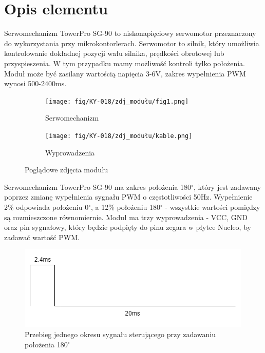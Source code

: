 \documentclass[11pt, a4paper]{article}
\author{Antoni Borowski}
\institute{Instytut Robotyki i Inteligencji Maszynowej}
\begin{document}
\newpage

\section*{Opis elementu} 
Serwomechanizm TowerPro SG-90 to niskonapięciowy serwomotor przeznaczony do wykorzystania przy mikrokontorlerach. Serwomotor to silnik, który umożliwia kontrolowanie dokładnej pozycji wału silnika, prędkości obrotowej lub przyspieszenia. W tym przypadku mamy możliwość kontroli tylko położenia. Moduł może być zasilany wartością napięcia 3-6V, zakres wypełnienia PWM wynosi 500-2400ms.

\begin{figure}[h!]
\centering
\begin{subfigure}{.5\textwidth}
  \centering
  \texttt{[image: fig/KY-018/zdj\_modułu/fig1.png]}
  \caption{Serwomechanizm}
  \label{fig:sub1}
\end{subfigure}%
\begin{subfigure}{.5\textwidth}
  \centering
  \texttt{[image: fig/KY-018/zdj\_modułu/kable.png]}
  \caption{Wyprowadzenia}
  \label{fig:sub2}
\end{subfigure}
\caption{Poglądowe zdjęcia modułu}
\label{fig:test}
\end{figure}

\newline
Serwomechanizm TowerPro SG-90 ma zakres położenia 180$^{\circ}$, który jest zadawany poprzez zmianę wypełnienia sygnału PWM o częstotliwości 50Hz. Wypełnienie 2\% odpowiada położeniu 0$^{\circ}$, a 12\% położeniu 180$^{\circ}$ - wszystkie wartości pomiędzy są rozmieszczone równomiernie. Moduł ma trzy wyprowadzenia - VCC, GND oraz pin sygnałowy, który będzie podpięty do pinu zegara w płytce Nucleo, by zadawać wartość PWM.
\begin{figure}[h!]
\centering
  \centering
  \includegraphics[width=1\linewidth]{fig/KY-018/zasada_dzialania/jeden cykl.png}
  \caption{Przebieg jednego okresu sygnału sterującego przy zadawaniu położenia 180$^{\circ}$}
  \label{fig:sub1}
\end{figure}
\end{document}

